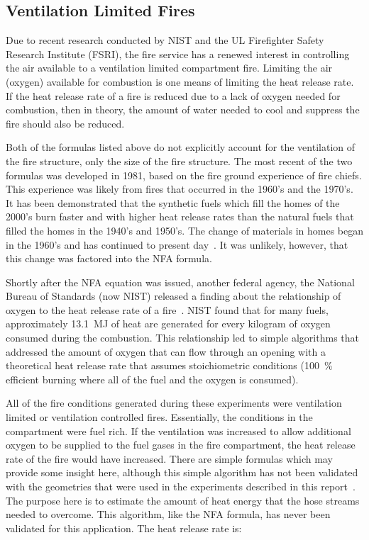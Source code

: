 \documentclass[12pt,oneside]{book}
\begin{document}
\subsection{Ventilation Limited Fires}
Due to recent research conducted by NIST and the UL Firefighter Safety Research Institute (FSRI), the fire service has a renewed interest in controlling the air available to a ventilation limited compartment fire. Limiting the air (oxygen) available for combustion is one means of limiting the heat release rate. If the heat release rate of a fire is reduced due to a lack of oxygen needed for combustion, then in theory, the amount of water needed to cool and suppress the fire should also be reduced.    

Both of the formulas listed above do not explicitly account for the ventilation of the fire structure, only the size of the fire structure. The most recent of the two formulas was developed in 1981, based on the fire ground experience of fire chiefs. This experience was likely from fires that occurred in the 1960's and the 1970's. It has been demonstrated that the synthetic fuels which fill the homes of the 2000's burn faster and with higher heat release rates than the natural fuels that filled the homes in the 1940's and 1950's. The change of materials in homes began in the 1960's and has continued to present day~\cite{Kerber:2}. It was unlikely, however, that this change was factored into the NFA formula.   

Shortly after the NFA equation was issued, another federal agency, the National Bureau of Standards (now NIST) released a finding about the relationship of oxygen to the heat release rate of a fire~\cite{Babrauskas:3}. NIST found that for many fuels, approximately 13.1~MJ of heat are generated for every kilogram of oxygen consumed during the combustion. This relationship led to simple algorithms that addressed the amount of oxygen that can flow through an opening with a theoretical heat release rate that assumes stoichiometric conditions (100~\% efficient burning where all of the fuel and the oxygen is consumed).

All of the fire conditions generated during these experiments were ventilation limited or ventilation controlled fires. Essentially, the conditions in the compartment were fuel rich. If the ventilation was increased to allow additional oxygen to be supplied to the fuel gases in the fire compartment, the heat release rate of the fire would have increased. There are simple formulas which may provide some insight here, although this simple algorithm has not been validated with the geometries that were used in the experiments described in this report~\cite{Babrauskas:4}. The purpose here is to estimate the amount of heat energy that the hose streams needed to overcome. This algorithm, like the NFA formula, has never been validated for this application. The heat release rate is: 
\end{document}
